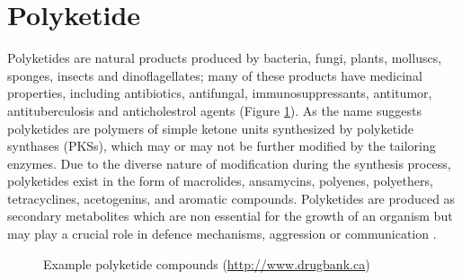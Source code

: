 	\section{Polyketide}
	\label{sec:Polyketide}
	Polyketides are natural products produced by bacteria, fungi, plants, molluscs, sponges, insects and dinoflagellates; many of these products have medicinal properties,  including antibiotics, antifungal, immunosuppressants, antitumor, antituberculosis and anticholestrol agents (Figure \ref{fig:Polyketides}). As the name suggests polyketides are polymers of simple ketone units synthesized by polyketide synthases (PKSs), which may or may not be further modified by the tailoring enzymes. Due to the diverse nature of modification during the synthesis process, polyketides exist in the form of macrolides, ansamycins, polyenes, polyethers, tetracyclines, acetogenins, and aromatic compounds. Polyketides are produced as secondary metabolites which are non essential for the growth of an organism but may play a crucial role in defence mechanisms, aggression or communication \parencite{Bender1999, Staunton2001, Weissman2005}. 
	
	\setlength\fboxsep{5pt}
	\setlength\fboxrule{1.5pt}
	\begin{figure} [htbp]
	\centering
	\caption[Example polyketide compounds]{Example polyketide compounds (\url{http://www.drugbank.ca})}
	\label{fig:Polyketides}
	\end{figure}
	
